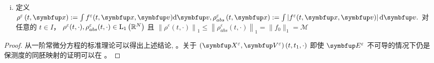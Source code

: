 \begin{lemma}
\begin{enumerate}[(i)]
\item  定义 $\rho^{\varepsilon}\left(t, \vx\right):=\int f^{\varepsilon}(t, \vx, \vv) \mathrm{d} \vv,\rho^{\varepsilon}_{abs}\left(t, \vx\right):=\int\left|f^{\varepsilon}(t, \vx, \vv)\right| \mathrm{d} \vv .$ 
对任意的 $t \in I$， $\rho^{\varepsilon}(t, \cdot),\rho_{abs}^{\varepsilon}(t, \cdot) \in \mathrm{L}_{1}\left({\mathbb{R}}^{N}\right)$ 且
$\left\|\rho^{\varepsilon}(t, \cdot)\right\|_{1} \leqslant\left\|\rho^{\varepsilon}_{abs}(t, \cdot)\right\|_{1}=\|f_{0}\|_{1}=\mathcal{M}$ %

\end{enumerate}
\end{lemma}

\begin{proof}
    从一阶常微分方程的标准理论可以得出上述结论, \cite[pp. 131]{hartman2002ordinary}。关于 $(\vect{X}^{\varepsilon},\vect{V}^{\varepsilon})\left(t, t_{1}, \cdot\right)$ 即使 $\vE^{\varepsilon}$ 不可导的情况下仍是保测度的同胚映射的证明可以在 \cite[pp. 62]{batt1962fixpunktprobleme}。%
\end{proof}


